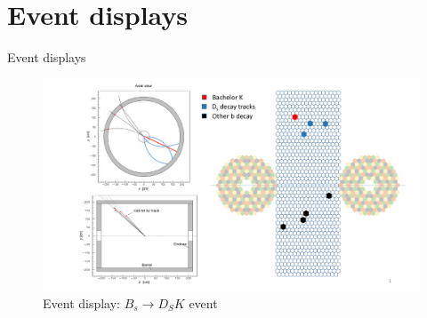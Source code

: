 \documentclass{beamer}
\begin{document}
\section{Event displays}
\begin{frame}{Event displays}
  \begin{figure}
    \centering
    \includegraphics[width = 1.0\textwidth, trim = {0cm 0cm 0cm 0cm}, clip = true]{Plots/Display2.pdf}
    \caption{Event display: $B_s\to D_SK$ event}
  \end{figure}
\end{frame}
\end{document}
